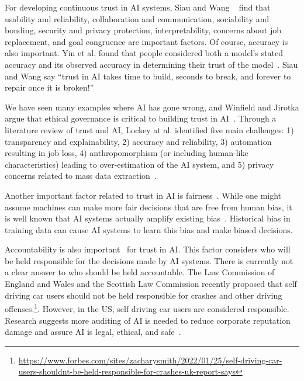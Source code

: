 \documentclass{article}
\begin{document}
For developing continuous trust in AI systems, Siau and Wang ~\cite{siau2018building} find that usability and reliability, collaboration and communication, sociability and bonding, security and privacy protection, interpretability, concerns about job replacement, and goal congruence are important factors. Of course, accuracy is also important. Yin et al. found that people considered both a model's stated accuracy and its observed accuracy in determining their trust of the model~\cite{yin2019understanding}. Siau and Wang say ``trust in AI
takes time to build, seconds to break, and forever to
repair once it is broken!''~\cite{siau2018building}

We have seen many examples where AI has gone wrong, and Winfield and Jirotka argue that ethical governance is critical to building
trust in AI~\cite{winfield2018ethical}. Through a  literature review of trust and AI, Lockey at al. identified five main challenges: 1)
transparency and explainability, 2) accuracy and
reliability, 3) automation resulting in job loss, 4) anthropomorphism (or including human-like characteristics) leading to over-estimation of the AI system, and
5) privacy concerns related to mass data extraction~\cite{lockey2021review}.

Another important factor related to trust in AI is fairness~\cite{vakkuri2020current}. While one might assume machines can make more fair decisions that are free from human bias, it is well known that AI systems actually amplify existing bias~\cite{chauhan2022role, ntoutsi2020bias}. Historical bias in training data can cause AI systems to learn this bias and make biased decisions.

Accountability is also important~\cite{vakkuri2020current} for trust in AI. This factor considers who will be held responsible for the decisions made by AI systems. There is currently not a clear answer to who should be held accountable. The Law Commission of England and Wales and the Scottish Law Commission recently proposed that self driving car users should not be held responsible for crashes and other driving offenses.\footnote{\href{https://www.forbes.com/sites/zacharysmith/2022/01/25/self-driving-car-users-shouldnt-be-held-responsible-for-crashes-uk-report-says}{https://www.forbes.com/sites/zacharysmith/2022/01/25/self-driving-car-users-shouldnt-be-held-responsible-for-crashes-uk-report-says}}. However, in the US, self driving car users are considered responsible. Research suggests more auditing of AI is needed to reduce corporate reputation damage and assure AI is legal, ethical, and safe~\cite{koshiyama2022algorithm}. 
\end{document}
